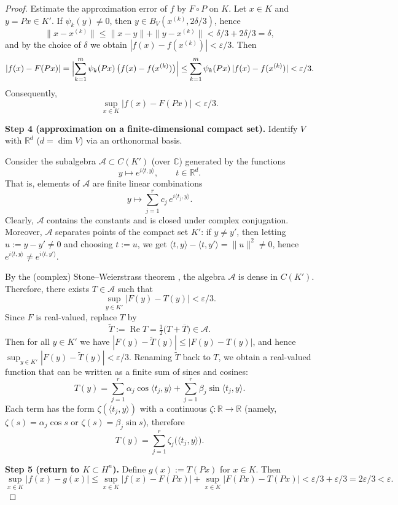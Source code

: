 \documentclass[final,12pt]{colt2026} %
\begin{document}
\begin{proof}
Estimate the approximation error of $f$ by $F\circ P$ on $K$.
Let $x\in K$ and $y=Px\in K'$. If $\psi_k(y)\neq 0$, then $y\in B_V(x^{(k)},2\delta/3)$, hence
\[
  \|x-x^{(k)}\|\le \|x-y\|+\|y-x^{(k)}\|<\delta/3+2\delta/3=\delta,
\]
and by the choice of $\delta$ we obtain $|f(x)-f(x^{(k)})|<\varepsilon/3$.
Then
\[
  |f(x)-F(Px)|
  =\Bigl|\sum_{k=1}^m \psi_k(Px)\,\bigl(f(x)-f(x^{(k)})\bigr)\Bigr|
  \le \sum_{k=1}^m \psi_k(Px)\,|f(x)-f(x^{(k)})|
  <\varepsilon/3.
\]
Consequently,
\[
  \sup_{x\in K}|f(x)-F(Px)|<\varepsilon/3.
\]

\textbf{Step 4 (approximation on a finite-dimensional compact set).} Identify $V$ with $\mathbb{R}^d$ ($d=\dim V$) via an orthonormal basis.

Consider the subalgebra $\mathcal{A}\subset C(K')$ (over $\mathbb{C}$) generated by the functions
\[
  y\longmapsto e^{i\langle t,y\rangle},\qquad t\in\mathbb{R}^d.
\]
That is, elements of $\mathcal{A}$ are finite linear combinations
\[
  y\longmapsto \sum_{j=1}^r c_j\,e^{i\langle t_j,y\rangle}.
\]
Clearly, $\mathcal{A}$ contains the constants and is closed under complex conjugation.
Moreover, $\mathcal{A}$ separates points of the compact set $K'$: if $y\neq y'$, then letting $u:=y-y'\neq 0$ and choosing $t:=u$, we get
\(
\langle t,y\rangle-\langle t,y'\rangle=\|u\|^2\neq 0
\), hence $e^{i\langle t,y\rangle}\neq e^{i\langle t,y'\rangle}$.

By the (complex) Stone--Weierstrass theorem \cite{rudin_rca}, the algebra $\mathcal{A}$ is dense in $C(K')$.
Therefore, there exists $T\in\mathcal{A}$ such that
\[
  \sup_{y\in K'}|F(y)-T(y)|<\varepsilon/3.
\]
Since $F$ is real-valued, replace $T$ by
\[
  \widetilde T:=\operatorname{Re} T=\tfrac12\bigl(T+\overline T\bigr)\in\mathcal{A}.
\]
Then for all $y\in K'$ we have
\(
|F(y)-\widetilde T(y)|\le |F(y)-T(y)|
\), and hence
\(
\sup_{y\in K'}|F(y)-\widetilde T(y)|<\varepsilon/3
\).
Renaming $\widetilde T$ back to $T$, we obtain a real-valued function that can be written as a finite sum of sines and cosines:
\[
  T(y)=\sum_{j=1}^r \alpha_j\cos\langle t_j,y\rangle+\sum_{j=1}^r \beta_j\sin\langle t_j,y\rangle.
\]
Each term has the form $\zeta(\langle t_j,y\rangle)$ with a continuous $\zeta\colon\mathbb{R}\to\mathbb{R}$ (namely, $\zeta(s)=\alpha_j\cos s$ or $\zeta(s)=\beta_j\sin s$), therefore
\[
  T(y)=\sum_{j=1}^r \zeta_j\bigl(\langle t_j,y\rangle\bigr).
\]

\textbf{Step 5 (return to $K\subset H^n$).} Define $g(x):=T(Px)$ for $x\in K$. Then
\[
  \sup_{x\in K}|f(x)-g(x)|
  \le
  \sup_{x\in K}|f(x)-F(Px)|+\sup_{x\in K}|F(Px)-T(Px)|
  <\varepsilon/3+\varepsilon/3=2\varepsilon/3<\varepsilon.
\]


\end{proof}
\end{document}
